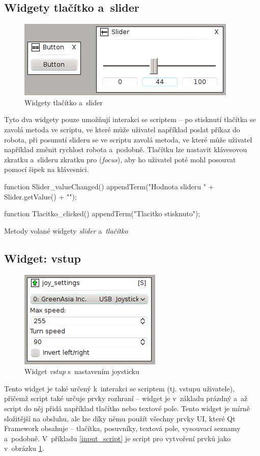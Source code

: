 \documentclass[12pt, a4paper, oneside]{article}
\newcommand{\It}{\textit}  %
\begin{document}
\subsection{Widgety tlačítko a~slider}
\begin{figure}[H]
\begin{center}
\includegraphics[scale=1]{img/w_btn_slider.png}
\caption{Widgety tlačítko a~slider}
\end{center}
\end{figure}
Tyto dva widgety pouze umožňují interakci se scriptem -- po stisknutí tlačítka se zavolá metoda ve scriptu, ve které může uživatel například poslat příkaz do robota, při posunutí slideru se ve scriptu zavolá metoda, ve které může uživatel například změnit rychlost robota a~podobně. Tlačítku lze nastavit klávesovou zkratku a~slideru zkratku pro (\It{focus}), aby ho uživatel poté mohl posouvat pomocí šipek na klávesnici.
\begin{listing}[H]
\begin{jscode}
function Slider_valueChanged() {
    appendTerm("Hodnota slideru " + Slider.getValue() + "\n");
}

function Tlacitko_clicked() {
    appendTerm("Tlacitko stisknuto\n");
}
\end{jscode}
\caption{Metody volané widgety \It{slider} a~\It{tlačítko}}
\end{listing}

\subsection{Widget: vstup}
\begin{figure}[H]
\begin{center}
\includegraphics[scale=1]{img/w_input.png}
\caption{Widget \It{vstup} s~nastavením joysticku}
\label{input}
\end{center}
\end{figure}
Tento widget je také určený k~interakci se scriptem (tj. vstupu uživatele), přičemž script také určuje prvky rozhraní -- widget je v~základu prázdný a~až script do něj přidá například tlačítko nebo textové pole. Tento widget je mírně složitější na obsluhu, ale lze díky němu použít všechny prvky UI, které Qt Framework obsahuje -- tlačítka, posuvníky, textová pole, vysouvací seznamy a~podobně. V~příkladu \ref{input_script} je script pro vytvoření prvků jako v~obrázku \ref{input}.
\end{document}
